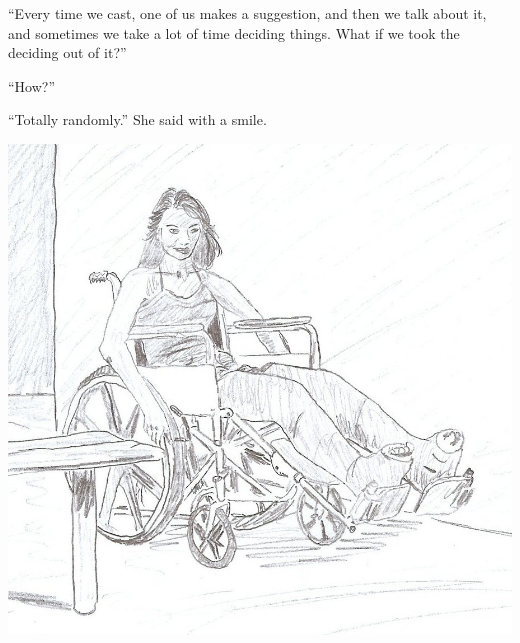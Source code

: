 ``Every time we cast, one of us makes a suggestion, and then we talk about it, and sometimes
we take a lot of time deciding things. What if we took the deciding out of it?''

``How?''

``Totally randomly.'' She said with a smile.

\begin{center}
\includegraphics{images/kicks35.jpg}
\end{center}
